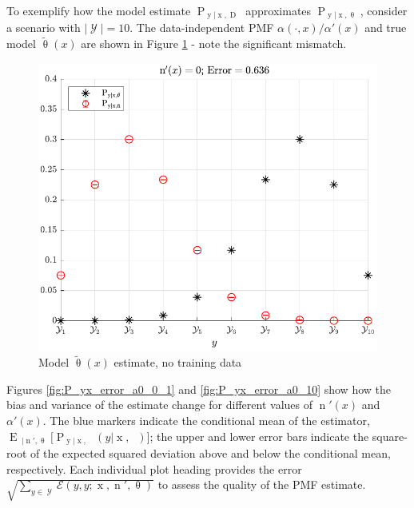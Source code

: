\documentclass[conference]{IEEEtran}
\DeclareMathOperator{\xrm}{\mathrm{x}}
\DeclareMathOperator{\yrm}{\mathrm{y}}
\DeclareMathOperator{\Drm}{\mathrm{D}}
\DeclareMathOperator{\nrm}{\mathrm{n}}
\DeclareMathOperator{\nbarrm}{\bar{\mathrm{n}}}
\DeclareMathOperator{\Prm}{\mathrm{P}}
\DeclareMathOperator{\Erm}{\mathrm{E}}
\DeclareMathOperator{\Ycal}{\mathcal{Y}}
\begin{document}
To exemplify how the model estimate $\Prm_{\yrm | \xrm,\Drm}$ approximates $\Prm_{\yrm | \xrm,\uptheta}$, consider a scenario with $|\Ycal| = 10$. The data-independent PMF $\alpha(\cdot,x)/\alpha'(x)$ and true model $\tilde{\uptheta}(x)$ are shown in Figure \ref{fig:P_yx_error_N_0} - note the significant mismatch. 

\begin{figure}
\centering
\includegraphics[width=0.9\linewidth]{P_yx_error_N_0.pdf}
\caption{Model $\tilde{\uptheta}(x)$ estimate, no training data}
\label{fig:P_yx_error_N_0}
\end{figure}

Figures \ref{fig:P_yx_error_a0_0_1} and \ref{fig:P_yx_error_a0_10} show how the bias and variance of the estimate change for different values of $\nrm'(x)$ and $\alpha'(x)$. The blue markers indicate the conditional mean of the estimator, $\Erm_{\nbarrm | \nrm',\uptheta}\big[ \Prm_{\yrm | \xrm,\nbarrm}(y | \xrm,\nbarrm) \big]$; the upper and lower error bars indicate the square-root of the expected squared deviation above and below the conditional mean, respectively. Each individual plot heading provides the error $\sqrt{\sum_{y \in \Ycal} \mathcal{E}(y,y ; \xrm,\nrm',\uptheta)}$ to assess the quality of the PMF estimate. 
\end{document}
